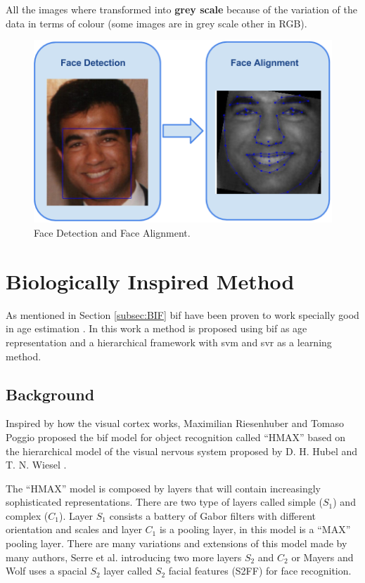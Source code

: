 All the images where transformed into \textbf{grey scale} because of the variation of the data in terms of colour (some images are in grey scale other in RGB).

\begin{figure}[!h]
	\centering
	\includegraphics[width=\textwidth]{figures/preprocessing}
	\caption{Face Detection and Face Alignment.}
	\label{fig:preprocessing}
\end{figure}


\section{Biologically Inspired Method}\label{sec:BIF}
As mentioned in Section \ref{subsec:BIF} \acrfull{bif} have been proven to work specially good in age estimation \cite{conf/cvpr/GuoMFH09}\cite{han:age}. In this work a method is proposed using \gls{bif} as age representation and a hierarchical framework with \gls{svm} and \gls{svr} as a learning method.
 
\subsection{Background}

Inspired by how the visual cortex works, Maximilian Riesenhuber and Tomaso Poggio \cite{Riesenhuber99hierarchicalmodels} proposed the \gls{bif} model for object recognition called ``HMAX'' based on the hierarchical model of the visual nervous system proposed by D. H. Hubel and T. N. Wiesel \cite{Hubel:62}. 

The ``HMAX'' model is composed by layers that will contain increasingly sophisticated representations. There are two type of layers called simple ($S_1$) and complex ($C_1$). Layer $S_1$ consists a battery of Gabor filters with different orientation and scales and layer $C_1$ is a pooling layer, in this model is a ``MAX'' pooling layer. There are many variations and extensions of this model made by many authors, Serre et al. \cite{4069258}\cite{1467551} introducing two more layers $S_2$ and $C_2$ or Mayers and Wolf \cite{Meyers:2008:UBI:1325290.1325298} uses a spacial $S_2$ layer called $S_2$ facial features (S2FF) for face recognition.

